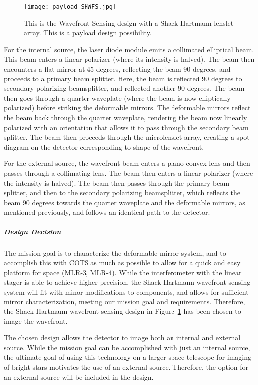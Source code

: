 \documentclass[12pt]{article}
\begin{document}
\begin{figure}[ht]
\centering
  \texttt{[image: payload\_SHWFS.jpg]}
\caption{This is the Wavefront Sensing design with a Shack-Hartmann lenslet array.  This is a payload design possibility.}
\label{fig:SHWFS}
\end{figure}

For the internal source, the laser diode module emits a collimated elliptical beam. This beam enters a linear polarizer (where its intensity is halved). The beam then encounters a flat mirror at 45 degrees, reflecting the beam 90 degrees, and proceeds to a primary beam splitter. Here, the beam is reflected 90 degrees to secondary polarizing beamsplitter, and reflected another 90 degrees. The beam then goes through a quarter waveplate (where the beam is now elliptically polarized) before striking the deformable mirrors. The deformable mirrors reflect the beam back through the quarter waveplate, rendering the beam now linearly polarized with an orientation that allows it to pass through the secondary beam splitter. The beam then proceeds through the microlenslet array, creating a spot diagram on the detector corresponding to shape of the wavefront.

For the external source, the wavefront beam enters a plano-convex lens and then passes through a collimating lens. The beam then enters a linear polarizer (where the intensity is halved). The beam then passes through the primary beam splitter, and then to the secondary polarizing beamsplitter, which reflects the beam 90 degrees towards the quarter waveplate and the deformable mirrors, as mentioned previously, and follows an identical path to the detector.

\subparagraph{Design Decision}
The mission goal is to characterize the deformable mirror system, and to accomplish this with COTS as much as possible to allow for a quick and easy platform for space (MLR-3, MLR-4). While the interferometer with the linear stager is able to achieve higher precision, the Shack-Hartmann wavefront sensing system will fit with minor modifications to components, and allows for sufficient mirror characterization, meeting our mission goal and requirements. Therefore, the Shack-Hartmann wavefront sensing design in Figure~\ref{fig:SHWFS} has been chosen to image the wavefront.

The chosen design allows the detector to image both an internal and external source. While the mission goal can be accomplished with just an internal source, the ultimate goal of using this technology on a larger space telescope for imaging of bright stars motivates the use of an external source. Therefore, the option for an external source will be included in the design.
\end{document}
